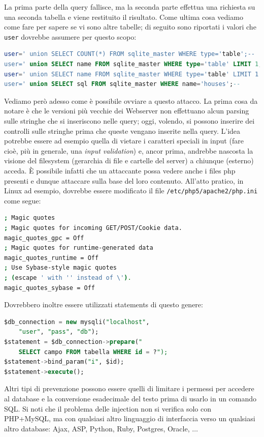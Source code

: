 La prima parte della query fallisce, ma la seconda parte effettua una richiesta su una seconda tabella e viene restituito il risultato. Come ultima cosa vediamo come fare per sapere se vi sono altre tabelle; di seguito sono riportati i valori che \texttt{user} dovrebbe assumere per questo scopo:
\begin{lstlisting}[language=sql]
user=' union SELECT COUNT(*) FROM sqlite_master WHERE type='table';--
user=' union SELECT name FROM sqlite_master WHERE type='table' LIMIT 1;--
user=' union SELECT name FROM sqlite_master WHERE type='table' LIMIT 1 OFFSET 1;--
user=' union SELECT sql FROM sqlite_master WHERE name='houses';--
\end{lstlisting}
Vediamo però adesso come è possibile ovviare a questo attacco. La prima cosa da notare è che le versioni più vecchie dei Webserver non effettuano alcun parsing sulle stringhe che si inseriscono nelle query; oggi, volendo, si possono inserire dei controlli sulle stringhe prima che queste vengano inserite nella query. L'idea potrebbe essere ad esempio quella di vietare i caratteri speciali in input (fare cioè, più in generale, una \textit{input validation}) e, ancor prima, andrebbe nascosta la visione del filesystem (gerarchia di file e cartelle del server) a chiunque (esterno) acceda. È possibile infatti che un attaccante possa vedere anche i files php presenti e dunque attaccare sulla base del loro contenuto. All'atto pratico, in Linux ad esempio, dovrebbe essere modificato il file \texttt{/etc/php5/apache2/php.ini} come segue:
\begin{lstlisting}[language=bash]
; Magic quotes
; Magic quotes for incoming GET/POST/Cookie data.
magic_quotes_gpc = Off
; Magic quotes for runtime-generated data
magic_quotes_runtime = Off
; Use Sybase-style magic quotes
; (escape ' with '' instead of \').
magic_quotes_sybase = Off
\end{lstlisting}
Dovrebbero inoltre essere utilizzati statements di questo genere:
\begin{lstlisting}[language=sql]
$db_connection = new mysqli("localhost",
	"user", "pass", "db");
$statement = $db_connection->prepare("
	SELECT campo FROM tabella WHERE id = ?");
$statement->bind_param("i", $id);
$statement->execute();
\end{lstlisting}
Altri tipi di prevenzione possono essere quelli di limitare i permessi per accedere al database e la conversione esadecimale del testo prima di usarlo in un comando SQL. Si noti che il problema delle injection non si verifica solo con PHP+MySQL, ma con qualsiasi altro linguaggio di interfaccia verso un qualsiasi altro database: Ajax, ASP, Python, Ruby, Postgres, Oracle, $\dots$

